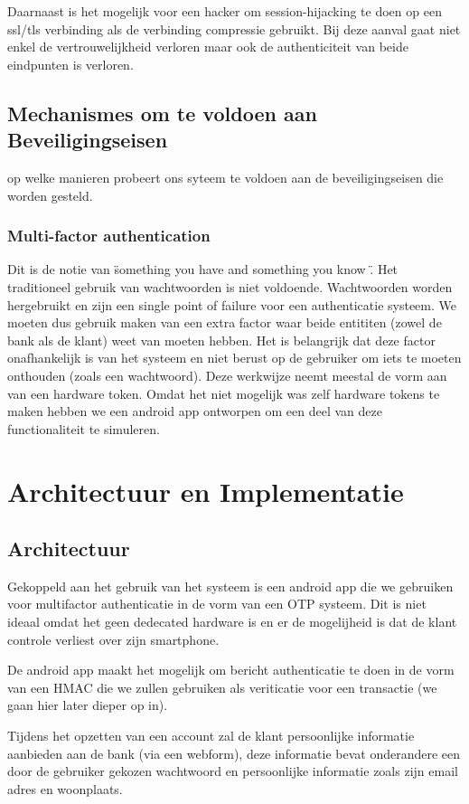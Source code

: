 \documentclass[11pt]{article}
\begin{document}
Daarnaast is het mogelijk voor een hacker om session-hijacking te doen op een ssl/tls verbinding als de verbinding compressie gebruikt. Bij deze aanval gaat niet enkel de vertrouwelijkheid verloren maar ook de authenticiteit van beide eindpunten is verloren.

\subsection{Mechanismes om te voldoen aan Beveiligingseisen}
op welke manieren probeert ons syteem te voldoen aan de beveiligingseisen die worden gesteld.

\subsubsection{Multi-factor authentication}
Dit is de notie van \"something you have and something you know \". 
Het traditioneel gebruik van wachtwoorden is niet voldoende. Wachtwoorden worden hergebruikt en zijn een single point of failure voor een authenticatie systeem. We moeten dus gebruik maken van een extra factor waar beide entititen (zowel de bank als de klant) weet van moeten hebben. Het is belangrijk dat deze factor onafhankelijk is van het systeem en niet berust op de gebruiker om iets te moeten onthouden (zoals een wachtwoord). Deze werkwijze neemt meestal de vorm aan van een hardware token. Omdat het niet mogelijk was zelf hardware tokens te maken hebben we een android app ontworpen om een deel van deze functionaliteit te simuleren.
\section{Architectuur en Implementatie}
\subsection{Architectuur}
Gekoppeld aan het gebruik van het systeem is een android app die we gebruiken voor multifactor authenticatie in de vorm van een OTP systeem. Dit is niet ideaal omdat het geen dedecated hardware is en er de mogelijheid is dat de klant controle verliest over zijn smartphone.

De android app maakt het mogelijk om bericht authenticatie te doen in de vorm van een HMAC die we zullen gebruiken als veriticatie voor een transactie (we gaan hier later dieper op in).

Tijdens het opzetten van een account zal de klant persoonlijke informatie aanbieden aan de bank (via een webform), deze informatie bevat onderandere een door de gebruiker gekozen wachtwoord en persoonlijke informatie zoals zijn email adres en woonplaats.
\end{document}
